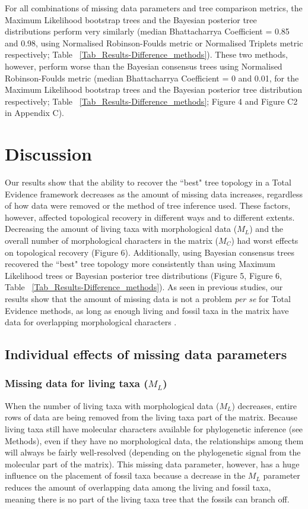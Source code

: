 \documentclass[12pt,letterpaper]{article}
\begin{document}
For all combinations of missing data parameters and tree comparison metrics, the Maximum Likelihood bootstrap trees and the Bayesian posterior tree distributions perform very similarly (median Bhattacharrya Coefficient = 0.85 and 0.98, using Normalised Robinson-Foulds metric or Normalised Triplets metric respectively; Table ~\ref{Tab_Results-Difference_methods}).
These two methods, however, perform worse than the Bayesian consensus trees using Normalised Robinson-Foulds metric (median Bhattacharrya Coefficient = 0 and 0.01, for the Maximum Likelihood bootstrap trees and the Bayesian posterior tree distribution respectively; Table ~\ref{Tab_Results-Difference_methods}; Figure 4 and Figure C2 in Appendix C).

\section{Discussion}

Our results show that the ability to recover the ``best" tree topology in a Total Evidence framework decreases as the amount of missing data increases, regardless of how data were removed or the method of tree inference used.
These factors, however, affected topological recovery in different ways and to different extents.
Decreasing the amount of living taxa with morphological data ($M_{L}$) and the overall number of morphological characters in the matrix ($M_{C}$) had worst effects on topological recovery (Figure 6).
Additionally, using Bayesian consensus trees recovered the ``best" tree topology more consistently than using Maximum Likelihood trees or Bayesian posterior tree distributions (Figure 5, Figure 6, Table ~\ref{Tab_Results-Difference_methods}).
As seen in previous studies, our results show that the amount of missing data is not a problem \textit{per se} for Total Evidence methods, as long as enough living and fossil taxa in the matrix have data for overlapping morphological characters \citep[e.g.][]{kearneyfragmentary2002,wiensmissing2003,rouresite-specific2011,pattinsonphylogeny2014}.

\subsection{Individual effects of missing data parameters}
\subsubsection{Missing data for living taxa ($M_{L}$)}
When the number of living taxa with morphological data ($M_{L}$) decreases, entire rows of data are being removed from the living taxa part of the matrix.
Because living taxa still have molecular characters available for phylogenetic inference (see Methods), even if they have no morphological data, the relationships among them will always be fairly well-resolved (depending on the phylogenetic signal from the molecular part of the matrix).
This missing data parameter, however, has a huge influence on the placement of fossil taxa because a decrease in the $M_{L}$ parameter reduces the amount of overlapping data among the living and fossil taxa, meaning there is no part of the living taxa tree that the fossils can branch off.
\end{document}
